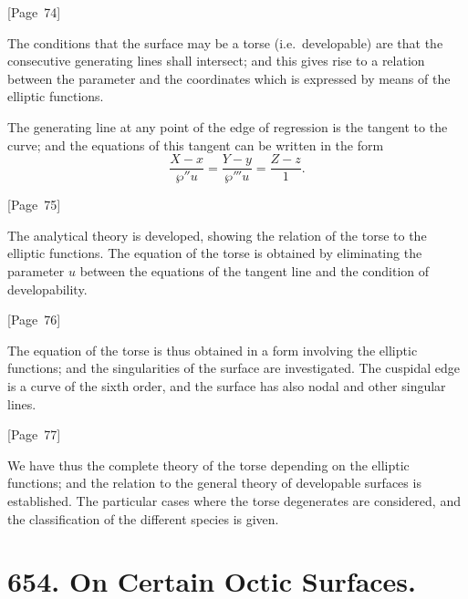 \documentclass[11pt,a4paper]{article}
\theoremstyle{plain}
\theoremstyle{definition}
\theoremstyle{remark}
\begin{document}
\begin{center}
[Page~74]
\end{center}

The conditions that the surface may be a torse (i.e.\ developable) are
that the consecutive generating lines shall intersect; and this gives
rise to a relation between the parameter and the coordinates which is
expressed by means of the elliptic functions.

The generating line at any point of the edge of regression is the
tangent to the curve; and the equations of this tangent can be written
in the form
\[
\frac{X - x}{\wp'' u} = \frac{Y - y}{\wp''' u} = \frac{Z - z}{1}.
\]

\begin{center}
[Page~75]
\end{center}

The analytical theory is developed, showing the relation of the torse
to the elliptic functions. The equation of the torse is obtained by
eliminating the parameter $u$ between the equations of the tangent
line and the condition of developability.

\begin{center}
[Page~76]
\end{center}

The equation of the torse is thus obtained in a form involving the
elliptic functions; and the singularities of the surface are
investigated. The cuspidal edge is a curve of the sixth order, and
the surface has also nodal and other singular lines.

\begin{center}
[Page~77]
\end{center}

We have thus the complete theory of the torse depending on the
elliptic functions; and the relation to the general theory of
developable surfaces is established. The particular cases where the
torse degenerates are considered, and the classification of the
different species is given.


\newpage
\section*{654. On Certain Octic Surfaces.}
\end{document}
